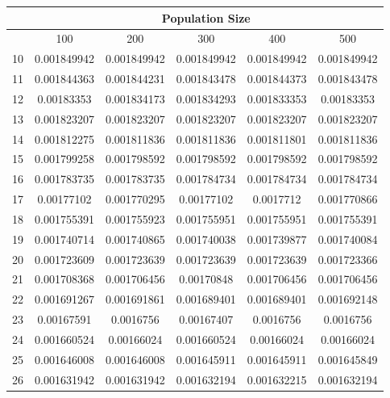     \begin{table}[H]
        \centering
        \begin{tabular}{|c|c|c|c|c|c|} \hline
            \textbf{} & \multicolumn{5}{c|}{\textbf{Population Size}} \\ \hline
                      & 100     & 200     & 300     & 400    & 500    \\ \hline
           10	 & 	0.001849942	 & 	0.001849942	 & 	0.001849942	 & 	0.001849942	 & 	0.001849942	 \\ \hline
11	 & 	0.001844363	 & 	0.001844231	 & 	0.001843478	 & 	0.001844373	 & 	0.001843478	 \\ \hline
12	 & 	0.00183353	 & 	0.001834173	 & 	0.001834293	 & 	0.001833353	 & 	0.00183353	 \\ \hline
13	 & 	0.001823207	 & 	0.001823207	 & 	0.001823207	 & 	0.001823207	 & 	0.001823207	 \\ \hline
14	 & 	0.001812275	 & 	0.001811836	 & 	0.001811836	 & 	0.001811801	 & 	0.001811836	 \\ \hline
15	 & 	0.001799258	 & 	0.001798592	 & 	0.001798592	 & 	0.001798592	 & 	0.001798592	 \\ \hline
16	 & 	0.001783735	 & 	0.001783735	 & 	0.001784734	 & 	0.001784734	 & 	0.001784734	 \\ \hline
17	 & 	0.00177102	 & 	0.001770295	 & 	0.00177102	 & 	0.0017712	 & 	0.001770866	 \\ \hline
18	 & 	0.001755391	 & 	0.001755923	 & 	0.001755951	 & 	0.001755951	 & 	0.001755391	 \\ \hline
19	 & 	0.001740714	 & 	0.001740865	 & 	0.001740038	 & 	0.001739877	 & 	0.001740084	 \\ \hline
20	 & 	0.001723609	 & 	0.001723639	 & 	0.001723639	 & 	0.001723639	 & 	0.001723366	 \\ \hline
21	 & 	0.001708368	 & 	0.001706456	 & 	0.00170848	 & 	0.001706456	 & 	0.001706456	 \\ \hline
22	 & 	0.001691267	 & 	0.001691861	 & 	0.001689401	 & 	0.001689401	 & 	0.001692148	 \\ \hline
23	 & 	0.00167591	 & 	0.0016756	 & 	0.00167407	 & 	0.0016756	 & 	0.0016756	 \\ \hline
24	 & 	0.001660524	 & 	0.00166024	 & 	0.001660524	 & 	0.00166024	 & 	0.00166024	 \\ \hline
25	 & 	0.001646008	 & 	0.001646008	 & 	0.001645911	 & 	0.001645911	 & 	0.001645849	 \\ \hline
26	 & 	0.001631942	 & 	0.001631942	 & 	0.001632194	 & 	0.001632215	 & 	0.001632194	 \\ \hline

\end{tabular}
\end{table}
